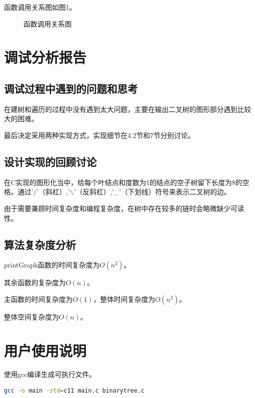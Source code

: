 \documentclass{article}
\begin{document}
函数调用关系图如图1。

\begin{figure}[htbp]


    \caption{函数调用关系图}

\end{figure}

\section{调试分析报告}

\subsection{调试过程中遇到的问题和思考}

在建树和遍历的过程中没有遇到太大问题，主要在输出二叉树的图形部分遇到比较大的困难。

最后决定采用两种实现方式，实现细节在4.2节和7节分别讨论。

\subsection{设计实现的回顾讨论}

在C实现的图形化当中，给每个叶结点和度数为1的结点的空子树留下长度为8的空格。通过'/'（斜杠）,'$\backslash$'（反斜杠）,'\_'（下划线）符号来表示二叉树的边。

由于需要兼顾时间复杂度和编程复杂度，在树中存在较多的链时会略微缺少可读性。

\subsection{算法复杂度分析}

printGraph函数的时间复杂度为$O(n^2)$。

其余函数的复杂度为$O(n)$。

主函数的时间复杂度为$O(1)$，整体时间复杂度为$O(n^2)$。

整体空间复杂度为$O(n)$。

\section{用户使用说明}

使用gcc编译生成可执行文件。

\begin{lstlisting}[language={bash},
    basicstyle=\small\consolas]
gcc -o main -std=c11 main.c binarytree.c
\end{lstlisting}
\end{document}
